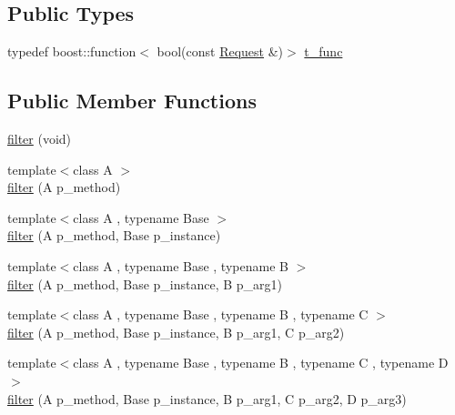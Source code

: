 \subsection*{Public Types}
\begin{DoxyCompactItemize}
\item 
typedef boost\+::function$<$ bool(const \hyperlink{classxtd_1_1network_1_1http_1_1Request}{Request} \&)$>$ \hyperlink{structxtd_1_1network_1_1http_1_1Server_1_1Handler_1_1filter_a7a443c95291e03dff64632da70c3970e}{t\+\_\+func}
\end{DoxyCompactItemize}
\subsection*{Public Member Functions}
\begin{DoxyCompactItemize}
\item 
\hyperlink{structxtd_1_1network_1_1http_1_1Server_1_1Handler_1_1filter_aade4e97fe12a8e43c647ac1ca7cc21c7}{filter} (void)
\item 
{\footnotesize template$<$class A $>$ }\\\hyperlink{structxtd_1_1network_1_1http_1_1Server_1_1Handler_1_1filter_af56d192d61507e75ff21f4f075df1bd3}{filter} (A p\+\_\+method)
\item 
{\footnotesize template$<$class A , typename Base $>$ }\\\hyperlink{structxtd_1_1network_1_1http_1_1Server_1_1Handler_1_1filter_a47da45a50b8b22c1a141d1602ac9f9eb}{filter} (A p\+\_\+method, Base p\+\_\+instance)
\item 
{\footnotesize template$<$class A , typename Base , typename B $>$ }\\\hyperlink{structxtd_1_1network_1_1http_1_1Server_1_1Handler_1_1filter_a4882bb6111bfa1007238091519723432}{filter} (A p\+\_\+method, Base p\+\_\+instance, B p\+\_\+arg1)
\item 
{\footnotesize template$<$class A , typename Base , typename B , typename C $>$ }\\\hyperlink{structxtd_1_1network_1_1http_1_1Server_1_1Handler_1_1filter_a9caa6426ff014b29d856845e542ecc61}{filter} (A p\+\_\+method, Base p\+\_\+instance, B p\+\_\+arg1, C p\+\_\+arg2)
\item 
{\footnotesize template$<$class A , typename Base , typename B , typename C , typename D $>$ }\\\hyperlink{structxtd_1_1network_1_1http_1_1Server_1_1Handler_1_1filter_aa73bc46ea27365b04dabc4ad3883f6e3}{filter} (A p\+\_\+method, Base p\+\_\+instance, B p\+\_\+arg1, C p\+\_\+arg2, D p\+\_\+arg3)

\end{DoxyCompactItemize}
